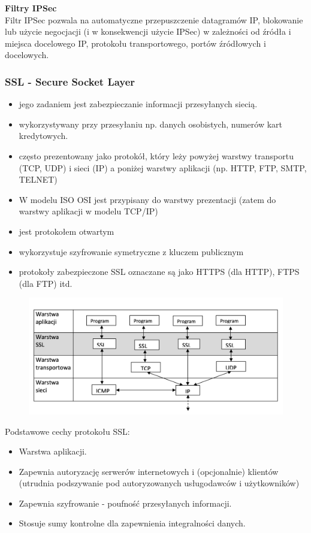 \documentclass[../main.tex]{subfiles}
\begin{document}
    \textbf{Filtry IPSec}\\
    Filtr IPSec pozwala na automatyczne przepuszczenie datagramów IP, blokowanie lub użycie
    negocjacji (i w konsekwencji użycie IPSec) w zależności od źródła i miejsca docelowego IP,
    protokołu transportowego, portów źródłowych i docelowych.


    \subsubsection{SSL - Secure Socket Layer}
    \begin{itemize}
        \item jego zadaniem jest zabezpieczanie informacji przesyłanych siecią.
        \item wykorzystywany przy przesyłaniu np. danych osobistych, numerów kart kredytowych.
        \item często prezentowany jako protokół, który leży
        powyżej warstwy transportu (TCP, UDP) i sieci (IP) a poniżej warstwy aplikacji (np. HTTP, FTP,
        SMTP, TELNET)
        \item W modelu ISO OSI jest przypisany do warstwy prezentacji (zatem do
        warstwy aplikacji w modelu TCP/IP)
        \item jest protokołem otwartym
        \item wykorzystuje szyfrowanie symetryczne z kluczem publicznym
        \item protokoły zabezpieczone SSL oznaczane są jako HTTPS (dla HTTP), FTPS (dla FTP) itd.
    \end{itemize}

    \begin{figure}[H]
        \includegraphics[width=\linewidth]{ssl.png}
    \end{figure}

    Podstawowe cechy protokołu SSL:
    \begin{itemize}
        \item Warstwa aplikacji.
        \item Zapewnia autoryzację serwerów internetowych i (opcjonalnie) klientów (utrudnia
        podszywanie pod autoryzowanych usługodawców i użytkowników)
        \item Zapewnia szyfrowanie - poufność przesyłanych informacji.
        \item Stosuje sumy kontrolne dla zapewnienia integralności danych.
    \end{itemize}
\end{document}
